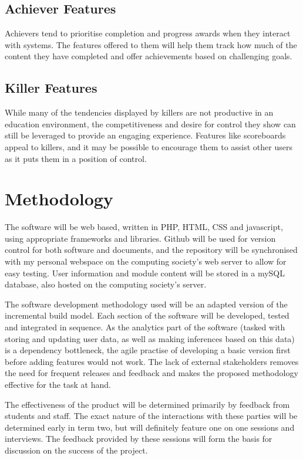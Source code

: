 \documentclass{report}
\begin{document}
\subsection*{Achiever Features}
Achievers tend to prioritise completion and progress awards when they interact with systems. The features offered to them will help them track how much of the content they have completed and offer achievements based on challenging goals.
\subsection*{Killer Features}
While many of the tendencies displayed by killers are not productive in an education environment, the competitiveness and desire for control they show can still be leveraged to provide an engaging experience. Features like scoreboards appeal to killers, and it may be possible to encourage them to assist other users as it puts them in a position of control.

\section*{Methodology}
The software will be web based, written in PHP, HTML, CSS and javascript, using appropriate frameworks and libraries. Github will be used for version control for both software and documents, and the repository will be synchronised with my personal webspace on the computing society's web server to allow for easy testing. User information and module content will be stored in a mySQL database, also hosted on the computing society's server.

The software development methodology used will be an adapted version of the incremental build model. Each section of the software will be developed, tested and integrated in sequence.  As the analytics part of the software (tasked with storing and updating user data, as well as making inferences based on this data) is a dependency bottleneck, the agile practise of developing a basic version first before adding features would not work. The lack of external stakeholders removes the need for frequent releases and feedback and makes the proposed methodology effective for the task at hand.

The effectiveness of the product will be determined primarily by feedback from students and staff. The exact nature of the interactions with these parties will be determined early in term two, but will definitely feature one on one sessions and interviews. The feedback provided by these sessions will form the basis for discussion on the success of the project.
\end{document}
